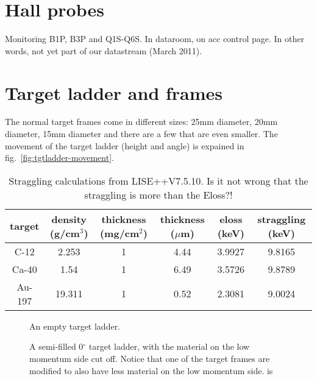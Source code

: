 \documentclass[11pt]{report}
\begin{document}
\section{Hall probes}
Monitoring B1P, B3P and Q1S-Q6S.
In dataroom, on acc control page. In other words, not yet part of 
our datastream (March 2011).


\section{Target ladder and frames}

The normal target frames come in different sizes:
25mm diameter, 20mm diameter, 15mm diameter and there are a few that are even smaller.
The movement of the target ladder (height and angle) 
is expained in fig.~\ref{fig:tgtladder-movement}.

\begin{table}[!ht]
\centering
\begin{tabular}{|c|c|c|c|c|c|}
\hline
target & density (g/cm$^3$) & thickness (mg/cm$^2$) & thickness ($\mu$m) & eloss (keV) & straggling (keV)\\ 
\hline
\hline
C-12   & 2.253  & 1  & 4.44  & 3.9927 & 9.8165 \\
Ca-40  & 1.54   & 1  & 6.49  & 3.5726 & 9.8789 \\
Au-197 & 19.311 & 1  & 0.52  & 2.3081 & 9.0024 \\
\hline
\end{tabular}
\caption{Straggling calculations from LISE++V7.5.10. Is it not wrong that the straggling is more than the
Eloss?!}
\label{table:straggling}
\end{table}

\begin{figure}[!ht]
\centerline{\vspace{0cm}\hspace{0cm}
}
\centering
\caption{An empty target ladder.}
\label{fig:tgt-ladder-empty}
\end{figure} 

\begin{figure}[!ht]
\centerline{\vspace{0cm}\hspace{0cm}
}
\centering
\caption{A semi-filled 0$^{\circ}$ target ladder, with the material on the low momentum 
side cut off.  Notice that one of the target frames are modified to also have less material
on the low momentum side.
is }
\label{fig:0degr-tgt-ladder}
\end{figure} 
\end{document}
